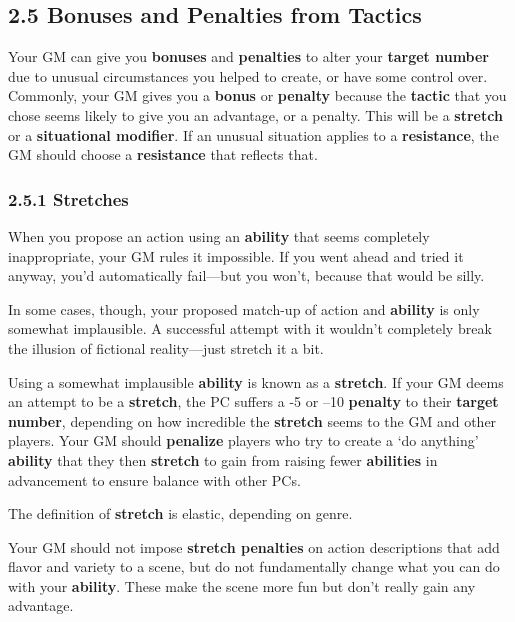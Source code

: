 \documentclass[
  11pt,
]{article}
\begin{document}
\hypertarget{bonuses-and-penalties-from-tactics}{%
\subsection{2.5 Bonuses and Penalties from
Tactics}\label{bonuses-and-penalties-from-tactics}}

Your GM can give you \textbf{bonuses} and \textbf{penalties} to alter
your \textbf{target number} due to unusual circumstances you helped to
create, or have some control over. Commonly, your GM gives you a
\textbf{bonus} or \textbf{penalty} because the \textbf{tactic} that you
chose seems likely to give you an advantage, or a penalty. This will be
a \textbf{stretch} or a \textbf{situational modifier}. If an unusual
situation applies to a \textbf{resistance}, the GM should choose a
\textbf{resistance} that reflects that.

\hypertarget{stretches}{%
\subsubsection{2.5.1 Stretches}\label{stretches}}

When you propose an action using an \textbf{ability} that seems
completely inappropriate, your GM rules it impossible. If you went ahead
and tried it anyway, you'd automatically fail---but you won't, because
that would be silly.

In some cases, though, your proposed match-up of action and
\textbf{ability} is only somewhat implausible. A successful attempt with
it wouldn't completely break the illusion of fictional reality---just
stretch it a bit.

Using a somewhat implausible \textbf{ability} is known as a
\textbf{stretch}. If your GM deems an attempt to be a \textbf{stretch},
the PC suffers a -5 or --10 \textbf{penalty} to their \textbf{target
number}, depending on how incredible the \textbf{stretch} seems to the
GM and other players. Your GM should \textbf{penalize} players who try
to create a `do anything' \textbf{ability} that they then
\textbf{stretch} to gain from raising fewer \textbf{abilities} in
advancement to ensure balance with other PCs.

The definition of \textbf{stretch} is elastic, depending on genre.

Your GM should not impose \textbf{stretch penalties} on action
descriptions that add flavor and variety to a scene, but do not
fundamentally change what you can do with your \textbf{ability}. These
make the scene more fun but don't really gain any advantage.
\end{document}
